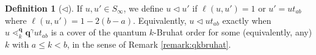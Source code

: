 \documentclass{amsart}
\theoremstyle{definition}
\newtheorem{definition}[lemma]{Definition}
\theoremstyle{remark}
\numberwithin{equation}{section}
\DeclareMathOperator{\sch}{\mathfrak{S}}
\DeclareMathOperator{\qsch}{\widetilde{\mathfrak{S}}}
\begin{document}
\newcommand{\lup}{\triangleleft}

\begin{definition}[$\lup$]
If $u,u'\in S_\infty$, we define $u\lup u'$ if $\ell(u,u')=1$ or $u'=ut_{ab}$ where $\ell(u,u')=1-2(b-a)$. Equivalently, $u\lup ut_{ab}$ exactly when $u\lessdot_k^{\mathbf q}\mathbf q^{\gamma}ut_{ab}$ is a cover of the quantum $k$-Bruhat order for some (equivalently, any) $k$ with $a\leq k<b$, in the sense of Remark \ref{remark:qkbruhat}.



%
%
%
%
\end{definition}
\end{document}

